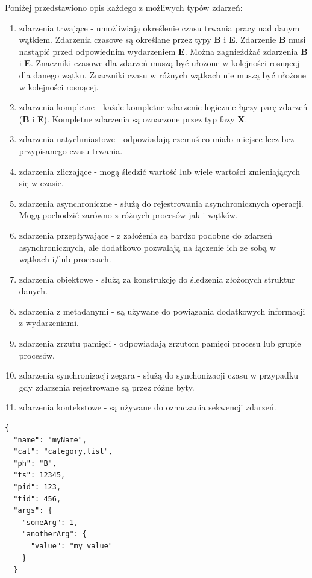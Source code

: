 \documentclass[polish, twoside, 12pt]{mwart}
\begin{document}
Poniżej przedstawiono opis każdego z możliwych typów zdarzeń:

\begin{enumerate}
  \item zdarzenia trwające - umożliwiają określenie czasu trwania pracy nad danym wątkiem. Zdarzenia czasowe są określane przez typy \textbf{B} i \textbf{E}. Zdarzenie \textbf{B} musi nastąpić przed odpowiednim wydarzeniem \textbf{E}. Można zagnieżdżać zdarzenia \textbf{B} i \textbf{E}. Znaczniki czasowe dla zdarzeń muszą być ułożone w kolejności rosnącej dla danego wątku. Znaczniki czasu w różnych wątkach nie muszą być ułożone w kolejności rosnącej.
  \item zdarzenia kompletne - każde kompletne zdarzenie logicznie łączy parę zdarzeń (\textbf{B} i \textbf{E}). Kompletne zdarzenia są oznaczone przez typ fazy \textbf{X}.
  \item zdarzenia natychmiastowe - odpowiadają czemuś co miało miejsce lecz bez przypisanego czasu trwania.
  \item zdarzenia zliczające - mogą śledzić wartość lub wiele wartości zmieniających się w czasie.
  \item zdarzenia asynchroniczne - służą do rejestrowania asynchronicznych operacji. Mogą pochodzić zarówno z różnych procesów jak i wątków.
  \item zdarzenia przepływające - z założenia są bardzo podobne do zdarzeń asynchronicznych, ale dodatkowo pozwalają na łączenie ich ze sobą w wątkach i/lub procesach.
  \item zdarzenia obiektowe - służą za konstrukcję do śledzenia złożonych struktur danych.
  \item zdarzenia z metadanymi - są używane do powiązania dodatkowych informacji z wydarzeniami.
  \item zdarzenia zrzutu pamięci - odpowiadają zrzutom pamięci procesu lub grupie procesów.
  \item zdarzenia synchronizacji zegara - służą do synchonizacji czasu w przypadku gdy zdarzenia rejestrowane są przez różne byty.
  \item zdarzenia kontekstowe - są używane do oznaczania sekwencji zdarzeń.
\end{enumerate}

\begin{lstlisting}[caption=Przykładowe zdarzenie]
{
  "name": "myName",
  "cat": "category,list",
  "ph": "B",
  "ts": 12345,
  "pid": 123,
  "tid": 456,
  "args": {
    "someArg": 1,
    "anotherArg": {
      "value": "my value"
    }
  }
\end{lstlisting}
\end{document}

